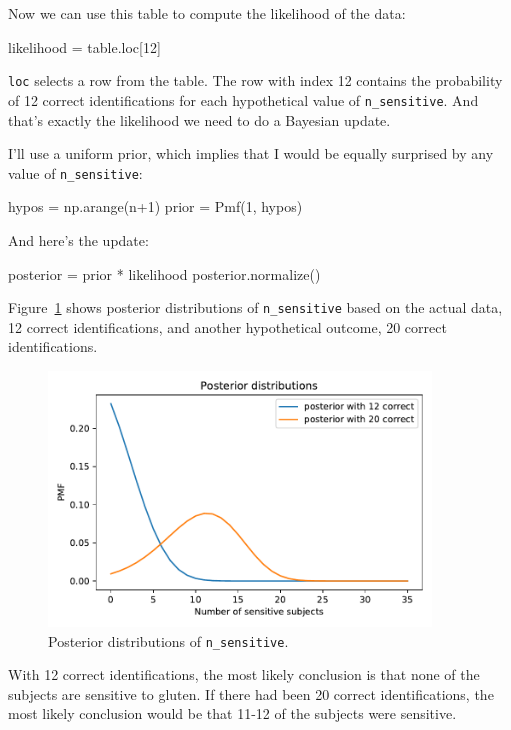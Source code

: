 \documentclass[12pt]{book}
\theoremstyle{exercise}
\newcommand{\py}[1]{{\tt #1}}%
\begin{document}
Now we can use this table to compute the likelihood of the data:

\begin{code}
likelihood = table.loc[12]
\end{code}

\py{loc} selects a row from the table.
The row with index 12 contains the probability of 12 correct identifications for each hypothetical value of \py{n_sensitive}.
And that's exactly the likelihood we need to do a Bayesian update.

I'll use a uniform prior, which implies that I would be equally surprised by any value of \py{n_sensitive}:

\begin{code}
hypos = np.arange(n+1)
prior = Pmf(1, hypos)
\end{code}

And here's the update:

\begin{code}
posterior = prior * likelihood
posterior.normalize()
\end{code}

Figure~\ref{fig05-04} shows posterior distributions of \py{n_sensitive} based on the actual data, 12 correct identifications, and another hypothetical outcome, 20 correct identifications.

\begin{figure}
\centerline{\includegraphics[width=4in]{figs/fig05-04.pdf}}
\caption{Posterior distributions of \py{n_sensitive}.}
\label{fig05-04}
\end{figure}

With 12 correct identifications, the most likely conclusion is that none of the subjects are sensitive to gluten.
If there had been 20 correct identifications, the most likely conclusion would be that 11-12 of the subjects were sensitive.
\end{document}
